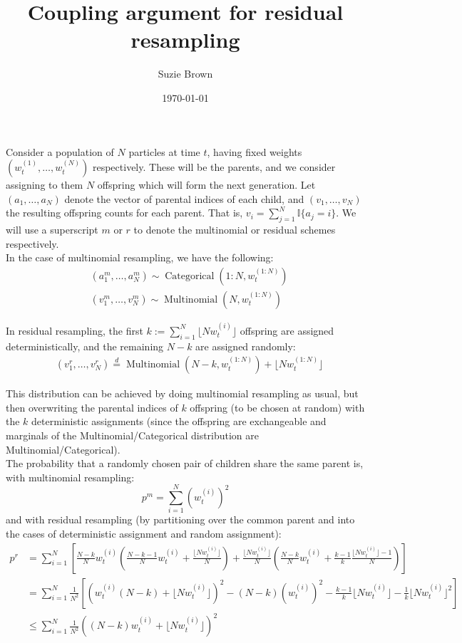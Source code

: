 \documentclass[fleqn]{article}
\title{Coupling argument for residual resampling}
\author{Suzie Brown}
\date{\today}
\newcommand{\eqdist}{\overset{d}{=}}
\newcommand{\I}[1]{\mathbb{I}\{#1\}}
\newcommand{\Mn}{\operatorname{Multinomial}}
\newcommand{\Cat}{\operatorname{Categorical}}
\newcommand{\wt}[2][t]{w_{#1}^{(#2)}}
\begin{document}
\maketitle
\thispagestyle{fancy}

Consider a population of $N$ particles at time $t$, having fixed weights $(\wt{1},\dots, \wt{N})$ respectively. These will be the parents, and we consider assigning to them $N$ offspring which will form the next generation. 
Let $(a_1, \dots, a_N)$ denote the vector of parental indices of each child, and $(v_1, \dots, v_N)$ the resulting offspring counts for each parent. That is, $v_i = \sum_{j=1}^N \I{a_j = i} $. We will use a superscript $m$ or $r$ to denote the multinomial or residual schemes respectively.\\

In the case of multinomial resampling, we have the following:
\begin{align*}
& (a_1^m, \dots, a_N^m) \sim \Cat(1:N, \wt{1:N}) \\
& (v_1^m, \dots, v_N^m) \sim \Mn(N, \wt{1:N})
\end{align*}

In residual resampling, the first $k := \sum_{i=1}^N \lfloor N\wt{i} \rfloor$ offspring are assigned deterministically, and the remaining $N-k$ are assigned randomly:
\begin{align*}
& (v_1^r, \dots, v_N^r) \eqdist \Mn(N-k, \wt{1:N}) + \lfloor N \wt{1:N} \rfloor
\end{align*}

This distribution can be achieved by doing multinomial resampling as usual, but then overwriting the parental indices of $k$ offspring (to be chosen at random) with the $k$ deterministic assignments (since the offspring are exchangeable and marginals of the Multinomial/Categorical distribution are Multinomial/Categorical).\\

The probability that a randomly chosen pair of children share the same parent is, with multinomial resampling:
\begin{equation*}
p^m = \sum_{i=1}^N (\wt{i})^2
\end{equation*}
and with residual resampling (by partitioning over the common parent and into the cases of deterministic assignment and random assignment):
\begin{align*}
p^r &= \sum_{i=1}^N  \left[ \frac{N-k}{N} \wt{i} \left( \frac{N-k-1}{N} \wt{i} + \frac{\lfloor N\wt{i}\rfloor}{N}\right) + \frac{\lfloor N\wt{i}\rfloor}{N} \left(\frac{N-k}{N} \wt{i} + \frac{k-1}{k} \frac{\lfloor N\wt{i}\rfloor -1}{N} \right) \right] \\
&= \sum_{i=1}^N \frac{1}{N^2} \left[ \left( \wt{i} (N-k) + \lfloor N\wt{i}\rfloor \right)^2 - (N-k) (\wt{i})^2 - \frac{k-1}{k} \lfloor N\wt{i}\rfloor - \frac{1}{k}  \lfloor N\wt{i}\rfloor^2 \right] \\
&\leq \sum_{i=1}^N \frac{1}{N^2} \left( (N-k) \wt{i} + \lfloor N\wt{i}\rfloor \right)^2
\end{align*}


\end{document}
